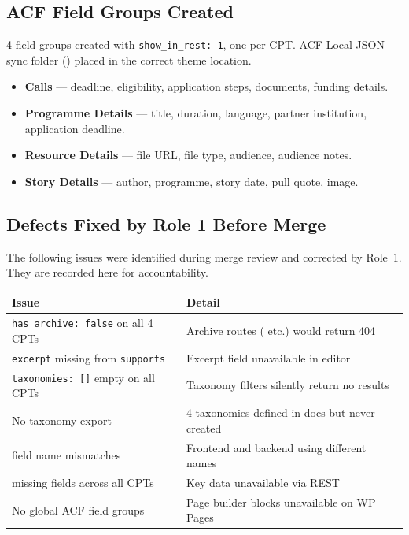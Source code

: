 \documentclass[12pt,a4paper]{article}
\begin{document}
\subsection{ACF Field Groups Created}

4 field groups created with \texttt{show\_in\_rest: 1}, one per CPT.
ACF Local JSON sync folder () placed in the correct
theme location.

\begin{itemize}
    \item \textbf{Calls} --- deadline, eligibility, application steps,
          documents, funding details.
    \item \textbf{Programme Details} --- title, duration, language,
          partner institution, application deadline.
    \item \textbf{Resource Details} --- file URL, file type, audience,
          audience notes.
    \item \textbf{Story Details} --- author, programme, story date,
          pull quote, image.
\end{itemize}

\subsection{Defects Fixed by Role 1 Before Merge}

The following issues were identified during merge review and corrected
by Role~1. They are recorded here for accountability.

\begin{longtable}{@{}L{5.6cm}L{7.6cm}@{}}
\toprule
{}
\textbf{Issue} & \textbf{Detail} \\
\midrule
\endhead
\texttt{has\_archive: false} on all 4 CPTs
    & Archive routes ( etc.) would return 404 \\
\addlinespace
\texttt{excerpt} missing from \texttt{supports}
    & Excerpt field unavailable in editor \\
\addlinespace
\texttt{taxonomies: []} empty on all CPTs
    & Taxonomy filters silently return no results \\
\addlinespace
No taxonomy export
    & 4 taxonomies defined in docs but never created \\
 field name mismatches
    & Frontend and backend using different names \\
 missing fields across all CPTs
    & Key data unavailable via REST \\
\addlinespace
No global ACF field groups
    & Page builder blocks unavailable on WP Pages \\
\bottomrule
\end{longtable}
\end{document}
